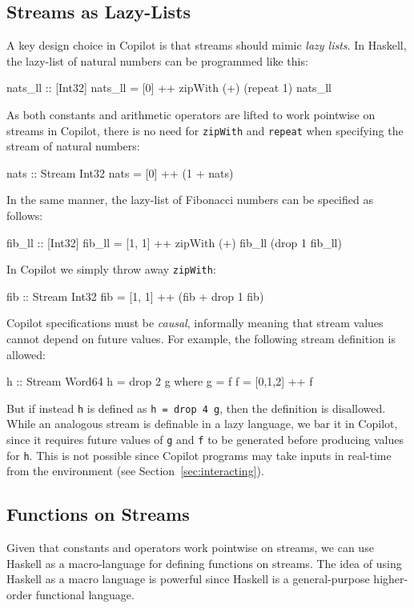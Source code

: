 \documentclass[]{article}
\theoremstyle{example}
\begin{document}
\subsection{Streams as Lazy-Lists} \label{sec:stream}

A key design choice in Copilot is that streams should mimic \emph{lazy lists}.
In Haskell, the lazy-list of natural numbers can be programmed like this:
%
\begin{code}
nats_ll :: [Int32]
nats_ll = [0] ++ zipWith (+) (repeat 1) nats_ll
\end{code}
%
As both constants and arithmetic operators are lifted to work pointwise on
streams in Copilot, there is no need for {\tt zipWith} and {\tt repeat} when
specifying the stream of natural numbers:
%
\begin{code}
nats :: Stream Int32
nats = [0] ++ (1 + nats)
\end{code}
%
In the same manner, the lazy-list of Fibonacci numbers can be specified as follows:
%
\begin{code}
fib_ll :: [Int32]
fib_ll = [1, 1] ++ zipWith (+) fib_ll (drop 1 fib_ll)
\end{code}
%
In Copilot we simply throw away {\tt zipWith}:
\begin{code}
fib :: Stream Int32
fib = [1, 1] ++ (fib + drop 1 fib)
\end{code}

Copilot specifications must be \emph{causal}, informally meaning that
stream values cannot depend on future values.  For example, the following stream
definition is allowed:
%
\begin{code}
h :: Stream Word64
h = drop 2 g
  where g = f
        f = [0,1,2] ++ f
\end{code}
%

But if instead {\tt h} is defined as {\tt h = drop 4 g}, then the definition is
disallowed.  While an analogous stream is definable in a lazy language, we bar
it in Copilot, since it requires future values of {\tt g} and {\tt f} to be
generated before producing values for {\tt h}.  This is not possible since
Copilot programs may take inputs in real-time from the environment (see
Section~\ref{sec:interacting}).

\subsection{Functions on Streams} \label{sec:FnOnStreams}

Given that constants and operators work pointwise on streams, we can use Haskell
as a macro-language for defining functions on streams.  The idea of using
Haskell as a macro language is powerful since Haskell is a
general-purpose higher-order functional language.
\end{document}
